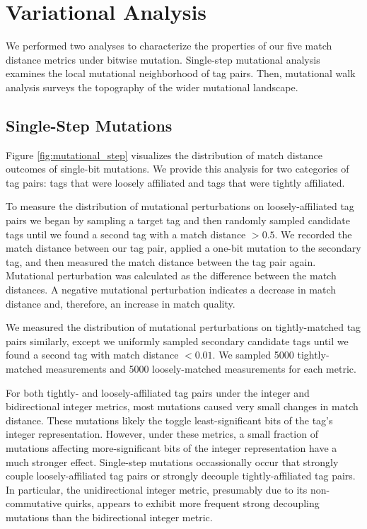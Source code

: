 \section{Variational Analysis} \label{sec:variational}

We performed two analyses to characterize the properties of our five match distance metrics under bitwise mutation.
Single-step mutational analysis examines the local mutational neighborhood of tag pairs.
Then, mutational walk analysis surveys the topography of the wider mutational landscape.

\subsection{Single-Step Mutations}



Figure \ref{fig:mutational_step} visualizes the distribution of match distance outcomes of single-bit mutations.
We provide this analysis for two categories of tag pairs: tags that were loosely affiliated and tags that were tightly affiliated.

To measure the distribution of mutational perturbations on loosely-affiliated tag pairs we began by sampling a target tag and then randomly sampled candidate tags until we found a second tag with a match distance $> 0.5$.
We recorded the match distance between our tag pair, applied a one-bit mutation to the secondary tag, and then measured the match distance between the tag pair again.
Mutational perturbation was calculated as the difference between the match distances.
A negative mutational perturbation indicates a decrease in match distance and, therefore, an increase in match quality.

We measured the distribution of mutational perturbations on tightly-matched tag pairs similarly, except we uniformly sampled secondary candidate tags until we found a second tag with match distance $< 0.01$.
We sampled 5000 tightly-matched measurements and 5000 loosely-matched measurements for each metric.

For both tightly- and loosely-affiliated tag pairs under the integer and bidirectional integer metrics, most mutations caused very small changes in match distance.
These mutations likely the toggle least-significant bits of the tag's integer representation.
However, under these metrics, a small fraction of mutations affecting more-significant bits of the integer representation have a much stronger effect.
Single-step mutations occassionally occur that strongly couple loosely-affiliated tag pairs or strongly decouple tightly-affiliated tag pairs.
In particular, the unidirectional integer metric, presumably due to its non-commutative quirks, appears to exhibit more frequent strong decoupling mutations than the bidirectional integer metric.

